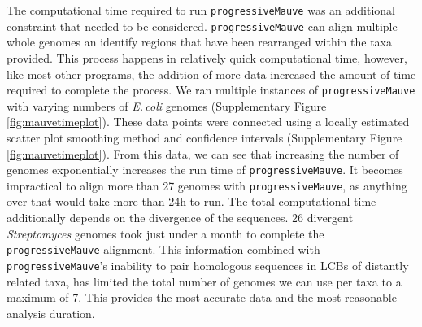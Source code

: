 \documentclass[11pt]{article}
\newcommand{\strep}{\textit{Streptomyces}\xspace}
\newcommand{\ecol}{\textit{E.\,coli}\xspace}
\newcommand{\p}{\texttt{progressiveMauve}\xspace}
\begin{document}
The computational time required to run \p was an additional constraint that needed to be considered.
\p can align multiple whole genomes an identify regions that have been rearranged within the taxa provided.
This process happens in relatively quick computational time, however, like most other programs, the addition of more data increased the amount of time required to complete the process.
We ran multiple instances of \p with varying numbers of \ecol genomes (Supplementary Figure \ref{fig:mauvetimeplot}).
These data points were connected using a locally estimated scatter plot smoothing method and confidence intervals (Supplementary Figure \ref{fig:mauvetimeplot}).
From this data, we can see that increasing the number of genomes exponentially increases the run time of \p.
It becomes impractical to align more than 27 genomes with \p, as anything over that would take more than 24h to run.
The total computational time additionally depends on the divergence of the sequences.
26 divergent \strep genomes took just under a month to complete the \p alignment.
This information combined with \p's inability to pair homologous sequences in LCBs of distantly related taxa, has limited the total number of genomes we can use per taxa to a maximum of 7.
This provides the most accurate data and the most reasonable analysis duration.
\end{document}
